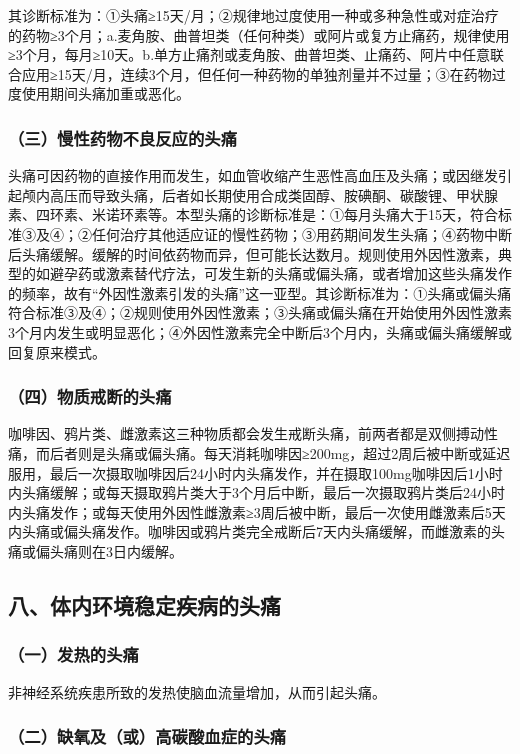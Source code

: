 其诊断标准为：①头痛≥15天/月；②规律地过度使用一种或多种急性或对症治疗的药物≥3个月；a.麦角胺、曲普坦类（任何种类）或阿片或复方止痛药，规律使用≥3个月，每月≥10天。b.单方止痛剂或麦角胺、曲普坦类、止痛药、阿片中任意联合应用≥15天/月，连续3个月，但任何一种药物的单独剂量并不过量；③在药物过度使用期间头痛加重或恶化。

\subsubsection{（三）慢性药物不良反应的头痛}

头痛可因药物的直接作用而发生，如血管收缩产生恶性高血压及头痛；或因继发引起颅内高压而导致头痛，后者如长期使用合成类固醇、胺碘酮、碳酸锂、甲状腺素、四环素、米诺环素等。本型头痛的诊断标准是：①每月头痛大于15天，符合标准③及④；②任何治疗其他适应证的慢性药物；③用药期间发生头痛；④药物中断后头痛缓解。缓解的时间依药物而异，但可能长达数月。规则使用外因性激素，典型的如避孕药或激素替代疗法，可发生新的头痛或偏头痛，或者增加这些头痛发作的频率，故有“外因性激素引发的头痛”这一亚型。其诊断标准为：①头痛或偏头痛符合标准③及④；②规则使用外因性激素；③头痛或偏头痛在开始使用外因性激素3个月内发生或明显恶化；④外因性激素完全中断后3个月内，头痛或偏头痛缓解或回复原来模式。

\subsubsection{（四）物质戒断的头痛}

咖啡因、鸦片类、雌激素这三种物质都会发生戒断头痛，前两者都是双侧搏动性痛，而后者则是头痛或偏头痛。每天消耗咖啡因≥200mg，超过2周后被中断或延迟服用，最后一次摄取咖啡因后24小时内头痛发作，并在摄取100mg咖啡因后1小时内头痛缓解；或每天摄取鸦片类大于3个月后中断，最后一次摄取鸦片类后24小时内头痛发作；或每天使用外因性雌激素≥3周后被中断，最后一次使用雌激素后5天内头痛或偏头痛发作。咖啡因或鸦片类完全戒断后7天内头痛缓解，而雌激素的头痛或偏头痛则在3日内缓解。

\subsection{八、体内环境稳定疾病的头痛}

\subsubsection{（一）发热的头痛}

非神经系统疾患所致的发热使脑血流量增加，从而引起头痛。

\subsubsection{（二）缺氧及（或）高碳酸血症的头痛}

